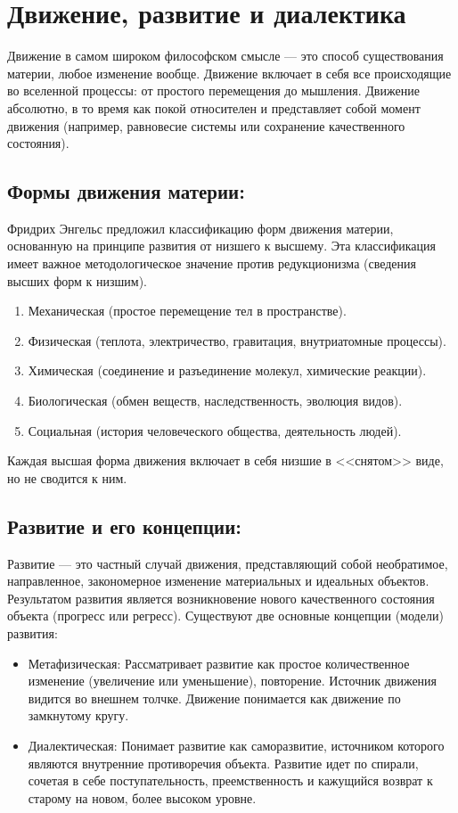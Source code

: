 \documentclass[12pt,a4paper]{article}
\begin{document}
	
	\section{Движение, развитие и диалектика~\checkmark}
	
	Движение в самом широком философском смысле — это способ существования материи, любое изменение вообще. Движение включает в себя все происходящие во вселенной процессы: от простого перемещения до мышления. Движение абсолютно, в то время как покой относителен и представляет собой момент движения (например, равновесие системы или сохранение качественного состояния).
	
	\subsection{Формы движения материи:}
	Фридрих Энгельс предложил классификацию форм движения материи, основанную на принципе развития от низшего к высшему. Эта классификация имеет важное методологическое значение против редукционизма (сведения высших форм к низшим).
	\begin{enumerate}
		\item Механическая (простое перемещение тел в пространстве).
		\item Физическая (теплота, электричество, гравитация, внутриатомные процессы).
		\item Химическая (соединение и разъединение молекул, химические реакции).
		\item Биологическая (обмен веществ, наследственность, эволюция видов).
		\item Социальная (история человеческого общества, деятельность людей).
	\end{enumerate}
	Каждая высшая форма движения включает в себя низшие в <<снятом>> виде, но не сводится к ним.
	
	\subsection{Развитие и его концепции:}
	Развитие — это частный случай движения, представляющий собой необратимое, направленное, закономерное изменение материальных и идеальных объектов. Результатом развития является возникновение нового качественного состояния объекта (прогресс или регресс).
	Существуют две основные концепции (модели) развития:
	\begin{itemize}
		\item Метафизическая: Рассматривает развитие как простое количественное изменение (увеличение или уменьшение), повторение. Источник движения видится во внешнем толчке. Движение понимается как движение по замкнутому кругу.
		\item Диалектическая: Понимает развитие как саморазвитие, источником которого являются внутренние противоречия объекта. Развитие идет по спирали, сочетая в себе поступательность, преемственность и кажущийся возврат к старому на новом, более высоком уровне.
	\end{itemize}
	
\end{document}
